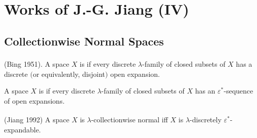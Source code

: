 \documentclass[main.tex]{subfiles}
\begin{document}
	
\chapter{Works of J.-G. Jiang (IV)} \label{ch8}
	
\section{Collectionwise Normal Spaces} \label{sec:8.1}
	

{ \textup{(\hstretch{1.8}{[}Bing 1951\hstretch{1.8}{]}\textsuperscript{\cite{Bing}})}. 
A space $X$ is 
if every discrete $\lambda$-family of closed subsets of $X$ has a discrete $($or equivalently, disjoint$)$ open expansion.
}

{  
A space $X$ is 
if every discrete 
$\lambda$-family of closed subsets of $X$ has an 
$\varepsilon^*$-sequence of open expansions.
}


{\theorem{\label{th:8-1-3}}  \textup{(\hstretch{1.8}{[}Jiang 1992\hstretch{1.8}{]}\textsuperscript{\cite{Jiang1992}})}
A space $X$ is $\lambda$-collectionwise normal iff $X$ is $\lambda$-discretely 
$\varepsilon^*$-expandable.
}
\end{document}
